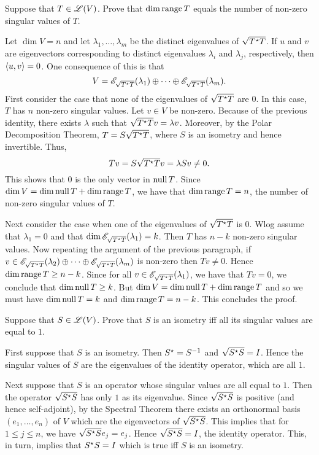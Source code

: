 \begin{exercise}
Suppose that $T \in \mathscr{L}(V)$. Prove that $\dim \operatorname{range} T$ equals the number
of non-zero singular values of $T$.
\end{exercise}
\begin{solution}
Let $\dim V = n$ and let $\lambda_1, \ldots, \lambda_m$ be the distinct eigenvalues
of $\sqrt{T^{\star} T}$. If $u$ and $v$ are eigenvectors corresponding to distinct
eigenvalues $\lambda_i$ and $\lambda_j$, respectively, then $\left \langle u, v \right \rangle = 0$.
One consequence of this is that
\[
    V = \mathscr{E}_{\sqrt{T^{\star} T}}(\lambda_1) \oplus \cdots \oplus
        \mathscr{E}_{\sqrt{T^{\star} T}}(\lambda_m).
\]
First consider the case that none of the eigenvalues of $\sqrt{T^{\star} T}$ are $0$.
In this case, $T$ has $n$ non-zero singular values.
Let $v \in V$ be non-zero. Because of the previous identity, there exists $\lambda$
such that $\sqrt{T^{\star} T} v = \lambda v$. Moreover, by the Polar Decomposition
Theorem, $T = S \sqrt{T^{\star} T}$, where $S$ is an isometry and hence invertible.
Thus,
\[
    Tv = S \sqrt{T^{\star} T} v = \lambda S v \neq 0.
\]
This shows that $0$ is the only vector in $\operatorname{null} T$. Since
$\dim V = \dim \operatorname{null} T + \dim \operatorname{range} T$, we have that $\dim \operatorname{range} T = n$,
the number of non-zero singular values of $T$.

Next consider the case when one of the eigenvalues of $\sqrt{T^{\star} T}$ is $0$. Wlog
assume that $\lambda_1 = 0$ and that $\dim \mathscr{E}_{\sqrt{T^{\star} T}}(\lambda_1) = k$.
Then $T$ has $n - k$ non-zero singular values.
Now repeating the argument of the previous paragraph, if
$v \in \mathscr{E}_{\sqrt{T^{\star} T}}(\lambda_2) \oplus \cdots \oplus
\mathscr{E}_{\sqrt{T^{\star} T}}(\lambda_m)$ is non-zero then $Tv \neq 0$. Hence
$\dim \operatorname{range} T \geq n - k$. Since for all
$v \in \mathscr{E}_{\sqrt{T^{\star} T}}(\lambda_1)$, we have that $T v = 0$, we conclude
that $\dim \operatorname{null} T \geq k$. But $\dim V = \dim \operatorname{null} T + \dim \operatorname{range} T$
and so we must have $\dim \operatorname{null} T = k$ and $\dim \operatorname{range} T = n - k$. This
concludes the proof.
\end{solution}

\begin{exercise}
Suppose that $S \in \mathscr{L}(V)$. Prove that $S$ is an isometry iff all its singular
values are equal to $1$.
\end{exercise}
\begin{solution}
First suppose that $S$ is an isometry. Then $S^{\star} = S^{-1}$ and
$\sqrt{S^{\star} S} = I$. Hence the singular values of $S$ are the eigenvalues of the
identity operator, which are all $1$.

Next suppose that $S$ is an operator whose singular values are all equal to $1$.
Then the operator $\sqrt{S^{\star} S}$ has only $1$ as its eigenvalue. Since
$\sqrt{S^{\star} S}$ is positive (and hence self-adjoint), by the Spectral Theorem
there exists an orthonormal basis $(e_1, \ldots, e_n)$ of $V$ which are the
eigenvectors of $\sqrt{S^{\star} S}$. This implies that for $1 \leq j \leq n$, we
have $\sqrt{S^{\star} S} e_j = e_j$. Hence $\sqrt{S^{\star} S} = I$, the identity
operator. This, in turn, implies that $S^{\star} S = I$ which is true iff $S$ is
an isometry.
\end{solution}

